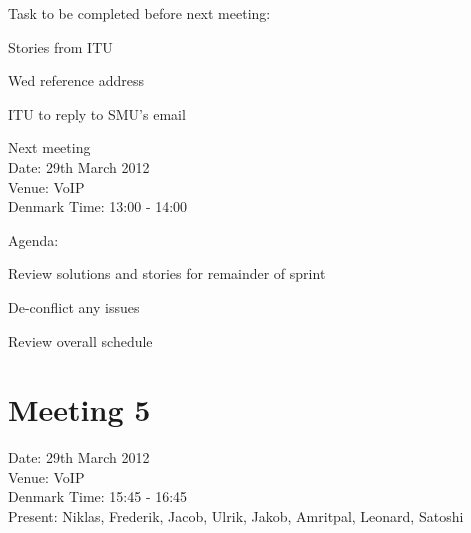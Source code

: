 Task to be completed before next meeting:
\begin{my_itemize}
\item Stories from ITU

\item Wed reference address

\item ITU to reply to SMU’s email

\end{my_itemize}

Next meeting\\
Date: 29th March 2012\\
Venue: VoIP\\
Denmark Time: 13:00 - 14:00
 
Agenda:
\begin{my_itemize}
\item Review solutions and stories for remainder of sprint

\item De-conflict any issues

\item Review overall schedule

\end{my_itemize}

\pagebreak

\section{Meeting 5}

Date: 29th March 2012\\
Venue: VoIP\\
Denmark Time: 15:45 - 16:45\\
Present: Niklas, Frederik, Jacob, Ulrik, Jakob, Amritpal, Leonard, Satoshi

